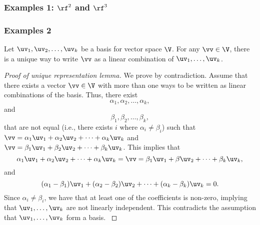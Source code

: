 \begin{frame}
  \frametitle{Examples 1: $\rf^2$ and $\rf^3$}
\end{frame}

\begin{frame}
  \frametitle{Examples 2}
\end{frame}

\begin{frame}
  \begin{lemma}
    Let $\uv_1,\uv_2,\ldots,\uv_k$ be a basis for vector space $\V$.
    For any $\vv\in\V$, there is a unique way to write $\vv$ as a
    linear combination of $\uv_1,\ldots,\uv_k$.
  \end{lemma}
\end{frame}

\begin{frame}
  \begin{proof}[Proof of unique representation lemma]
    {\small
  We prove by contradiction.  \pause Assume that there exists a vector
  $\vv\in\V$ with more than one ways to be written as linear
  combinations of the basis.  Thus, there exist
  \[ \alpha_1,\alpha_2,\ldots,\alpha_k, \] and
  \[ \beta_1,\beta_2,\ldots,\beta_k, \]
  that are not equal (i.e., there exists $i$ where
  $\alpha_i\neq\beta_i$)
  such that
  $\vv=\alpha_1\uv_1+\alpha_2\uv_2+\cdots+\alpha_k\uv_k$ and
  $\vv=\beta_1\uv_1+\beta_2\uv_2+\cdots+\beta_k\uv_k$.  \pause
  This implies that
  \[
  \alpha_1\uv_1+\alpha_2\uv_2+\cdots+\alpha_k\uv_k=\vv=\beta_1\uv_1+\beta\uv_2+\cdots+\beta_k\uv_k,
  \]
  and
  \[
  (\alpha_1-\beta_1)\uv_1 +
  (\alpha_2-\beta_2)\uv_2 + \cdots + (\alpha_k-\beta_k)\uv_k=0.
  \]
  \pause
  Since $\alpha_i\neq\beta_i$, we have that at least one of the
  coefficients is non-zero, implying that $\uv_1,\ldots,\uv_k$ are not
  linearly independent.  This contradicts the assumption that
  $\uv_1,\ldots,\uv_k$ form a basis.
  }
  \end{proof}
\end{frame}
